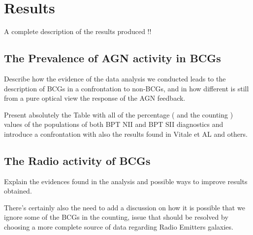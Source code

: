 \chapter{Results}

A complete description of the results produced !!
\section{The Prevalence of AGN activity in BCGs}
Describe how the evidence of the data analysis we conducted leads to the description of BCGs in a confrontation to non-BCGs, and in how different is still from a pure optical view the response of the AGN feedback.

Present absolutely the Table with all of the percentage ( and the counting ) values of the populations of both BPT NII and BPT SII diagnostics and introduce a confrontation with also the results found in Vitale et AL and others.

\section{The Radio activity of BCGs}
Explain the evidences found in the analysis and possible ways to improve results obtained.

There's certainly also the need to add a discussion on how it is possible that we ignore some of the BCGs in the counting, issue that should be resolved by choosing a more complete source of data regarding Radio Emitters galaxies.